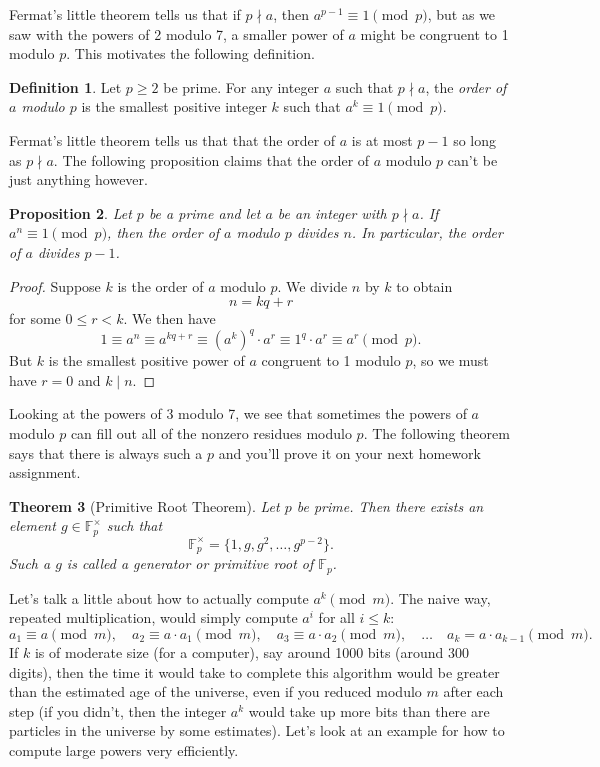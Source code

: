 \documentclass[12pt]{article}
\theoremstyle{plain}
\newtheorem{theorem}{Theorem}[section]
\newtheorem{proposition}[theorem]{Proposition}
\theoremstyle{definition}
\newtheorem{definition}[theorem]{Definition}
\theoremstyle{remark}
\newcommand{\F}{\mathbb{F}}
\begin{document}
Fermat's little theorem tells us that if $p\nmid a$, then $a^{p-1}\equiv 1\pmod p$, but as we saw with the powers of 2 modulo 7, a smaller power of $a$ might be congruent to 1 modulo $p$.
This motivates the following definition.

\begin{definition}
    Let $p\geq 2$ be prime. For any integer $a$ such that $p\nmid a$, the \emph{order of $a$ modulo $p$} is the smallest positive integer $k$ such that $a^k\equiv 1\pmod p$.
\end{definition}

Fermat's little theorem tells us that that the order of $a$ is at most $p-1$ so long as $p\nmid a$.
The following proposition claims that the order of $a$ modulo $p$ can't be just anything however.

\begin{proposition}
    Let $p$ be a prime and let $a$ be an integer with $p\nmid a$.
    If $a^n\equiv 1\pmod p$, then the order of $a$ modulo $p$ divides $n$.
    In particular, the order of $a$ divides $p-1$.
\end{proposition}

\begin{proof}
    Suppose $k$ is the order of $a$ modulo $p$.
    We divide $n$ by $k$ to obtain
    \[
        n = kq + r
    \]
    for some $0\leq r < k$.
    We then have
    \[
        1 \equiv a^n \equiv a^{kq + r} \equiv (a^k)^q\cdot a^r \equiv 1^q\cdot a^r \equiv a^r\pmod p.
    \]
    But $k$ is the smallest positive power of $a$ congruent to 1 modulo $p$, so we must have $r = 0$ and $k\mid n$.
\end{proof}

Looking at the powers of 3 modulo 7, we see that sometimes the powers of $a$ modulo $p$ can fill out all of the nonzero residues modulo $p$.
The following theorem says that there is always such a $p$ and you'll prove it on your next homework assignment.
\begin{theorem}[Primitive Root Theorem]
    Let $p$ be prime.
    Then there exists an element $g \in \F_p^\times$ such that
    \[
        \F_p^\times = \{1, g, g^2, \ldots, g^{p-2}\}.
    \]
    Such a $g$ is called a \emph{generator} or \emph{primitive root of }$\F_p$.
\end{theorem}


Let's talk a little about how to actually compute $a^k\pmod m$.
The naive way, repeated multiplication, would simply compute $a^i$ for all $i\leq k$:
\[
    a_1 \equiv a\pmod m,\quad a_2 \equiv a\cdot a_1 \pmod m,\quad a_3 \equiv a\cdot a_2\pmod m,\quad \ldots\quad a_k = a\cdot a_{k-1}\pmod m.
\]
If $k$ is of moderate size (for a computer), say around 1000 bits (around 300 digits), then the time it would take to complete this algorithm would be greater than the estimated age of the universe, even if you reduced modulo $m$ after each step (if you didn't, then the integer $a^k$ would take up more bits than there are particles in the universe by some estimates).
Let's look at an example for how to compute large powers very efficiently.
\end{document}
